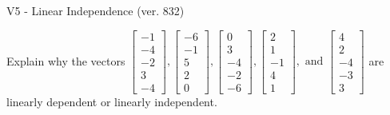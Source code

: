 \begin{exercise}
  \begin{exerciseTitle}V5 - Linear Independence (ver. 832)\end{exerciseTitle}
  \begin{exerciseStatement}
    Explain why the vectors \(\left[\begin{array}{r}
-1 \\
-4 \\
-2 \\
3 \\
-4
\end{array}\right] , \left[\begin{array}{r}
-6 \\
-1 \\
5 \\
2 \\
0
\end{array}\right] , \left[\begin{array}{r}
0 \\
3 \\
-4 \\
-2 \\
-6
\end{array}\right] , \left[\begin{array}{r}
2 \\
1 \\
-1 \\
4 \\
1
\end{array}\right] , \text{ and } \left[\begin{array}{r}
4 \\
2 \\
-4 \\
-3 \\
3
\end{array}\right]\) are linearly dependent or linearly independent.	



\end{exerciseStatement}
\end{exercise}
